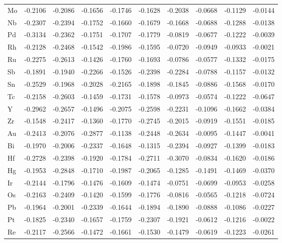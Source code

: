 \begin{table}[h]
{\begin{tabular}{*{10}{l}}
      Mo & -0.2106 & -0.2086 & -0.1656 & -0.1746 & -0.1628 & -0.2038 & -0.0668 & -0.1129 & -0.0144 \\
      Nb & -0.2307 & -0.2394 & -0.1752 & -0.1660 & -0.1679 & -0.1668 & -0.0688 & -0.1288 & -0.0138 \\
      Pd & -0.3134 & -0.2362 & -0.1751 & -0.1707 & -0.1779 & -0.0819 & -0.0677 & -0.1222 & -0.0039 \\
      Rh & -0.2128 & -0.2468 & -0.1542 & -0.1986 & -0.1595 & -0.0720 & -0.0949 & -0.0933 & -0.0021 \\
      Ru & -0.2275 & -0.2613 & -0.1426 & -0.1760 & -0.1693 & -0.0786 & -0.0577 & -0.1332 & -0.0175 \\
      Sb & -0.1891 & -0.1940 & -0.2266 & -0.1526 & -0.2398 & -0.2284 & -0.0788 & -0.1157 & -0.0132 \\
      Sn & -0.2529 & -0.1968 & -0.2028 & -0.2165 & -0.1898 & -0.1845 & -0.0886 & -0.1568 & -0.0170 \\
      Tc & -0.2158 & -0.2603 & -0.1459 & -0.1731 & -0.1578 & -0.0973 & -0.0574 & -0.1222 & -0.0647 \\
      Y  & -0.2962 & -0.2657 & -0.1496 & -0.2075 & -0.2598 & -0.2231 & -0.1096 & -0.1662 & -0.0384 \\
      Zr & -0.1548 & -0.2417 & -0.1360 & -0.1770 & -0.2745 & -0.2015 & -0.0919 & -0.1551 & -0.0185 \\
      Au & -0.2413 & -0.2076 & -0.2877 & -0.1138 & -0.2448 & -0.2634 & -0.0095 & -0.1447 & -0.0041 \\
      Bi & -0.1970 & -0.2006 & -0.2337 & -0.1648 & -0.1315 & -0.2394 & -0.0927 & -0.1399 & -0.0183 \\
      Hf & -0.2728 & -0.2398 & -0.1920 & -0.1784 & -0.2711 & -0.3070 & -0.0834 & -0.1620 & -0.0186 \\
      Hg & -0.1953 & -0.2848 & -0.1710 & -0.1987 & -0.2065 & -0.1285 & -0.1491 & -0.1469 & -0.0370 \\
      Ir & -0.2144 & -0.1796 & -0.1476 & -0.1609 & -0.1474 & -0.0751 & -0.0699 & -0.0953 & -0.0258 \\
      Os & -0.2163 & -0.2409 & -0.1420 & -0.1599 & -0.1776 & -0.0816 & -0.0565 & -0.1218 & -0.0724 \\
      Pb & -0.1964 & -0.2001 & -0.2339 & -0.1644 & -0.1894 & -0.1890 & -0.0888 & -0.1086 & -0.0227 \\
      Pt & -0.1825 & -0.2340 & -0.1657 & -0.1759 & -0.2307 & -0.1921 & -0.0612 & -0.1216 & -0.0022 \\
      Re & -0.2117 & -0.2566 & -0.1472 & -0.1661 & -0.1530 & -0.1479 & -0.0619 & -0.1223 & -0.0261 \\

\end{tabular}}
\end{table}
